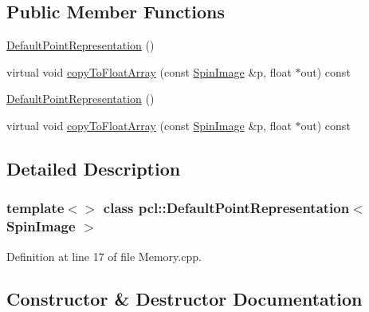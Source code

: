 \subsection*{Public Member Functions}
\begin{DoxyCompactItemize}
\item 
\hyperlink{classpcl_1_1_default_point_representation_3_01_spin_image_01_4_afa348f01d1192b29c50649a4a3cfadb9}{Default\+Point\+Representation} ()
\item 
virtual void \hyperlink{classpcl_1_1_default_point_representation_3_01_spin_image_01_4_af51ac110bddbb250714b11d268c6ea73}{copy\+To\+Float\+Array} (const \hyperlink{include_8h_ab79ade12a22a8e5e2864650f820e9c6f}{Spin\+Image} \&p, float $\ast$out) const
\item 
\hyperlink{classpcl_1_1_default_point_representation_3_01_spin_image_01_4_afa348f01d1192b29c50649a4a3cfadb9}{Default\+Point\+Representation} ()
\item 
virtual void \hyperlink{classpcl_1_1_default_point_representation_3_01_spin_image_01_4_af51ac110bddbb250714b11d268c6ea73}{copy\+To\+Float\+Array} (const \hyperlink{include_8h_ab79ade12a22a8e5e2864650f820e9c6f}{Spin\+Image} \&p, float $\ast$out) const
\end{DoxyCompactItemize}


\subsection{Detailed Description}
\subsubsection*{template$<$$>$\newline
class pcl\+::\+Default\+Point\+Representation$<$ Spin\+Image $>$}



Definition at line 17 of file Memory.\+cpp.



\subsection{Constructor \& Destructor Documentation}
\mbox{\label{classpcl_1_1_default_point_representation_3_01_spin_image_01_4_afa348f01d1192b29c50649a4a3cfadb9}} 

